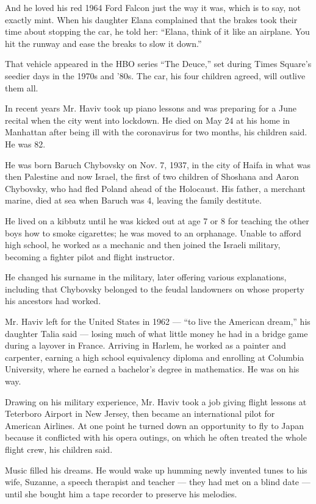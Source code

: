 And he loved his red 1964 Ford Falcon just the way it was, which is to
say, not exactly mint. When his daughter Elana complained that the
brakes took their time about stopping the car, he told her: ``Elana,
think of it like an airplane. You hit the runway and ease the breaks to
slow it down.''

That vehicle appeared in the HBO series ``The Deuce,'' set during Times
Square's seedier days in the 1970s and '80s. The car, his four children
agreed, will outlive them all.

In recent years Mr. Haviv took up piano lessons and was preparing for a
June recital when the city went into lockdown. He died on May 24 at his
home in Manhattan after being ill with the coronavirus for two months,
his children said. He was 82.

He was born Baruch Chybovsky on Nov. 7, 1937, in the city of Haifa in
what was then Palestine and now Israel, the first of two children of
Shoshana and Aaron Chybovsky, who had fled Poland ahead of the
Holocaust. His father, a merchant marine, died at sea when Baruch was 4,
leaving the family destitute.

He lived on a kibbutz until he was kicked out at age 7 or 8 for teaching
the other boys how to smoke cigarettes; he was moved to an orphanage.
Unable to afford high school, he worked as a mechanic and then joined
the Israeli military, becoming a fighter pilot and flight instructor.

He changed his surname in the military, later offering various
explanations, including that Chybovsky belonged to the feudal landowners
on whose property his ancestors had worked.

Mr. Haviv left for the United States in 1962 --- ``to live the American
dream,'' his daughter Talia said --- losing much of what little money he
had in a bridge game during a layover in France. Arriving in Harlem, he
worked as a painter and carpenter, earning a high school equivalency
diploma and enrolling at Columbia University, where he earned a
bachelor's degree in mathematics. He was on his way.

Drawing on his military experience, Mr. Haviv took a job giving flight
lessons at Teterboro Airport in New Jersey, then became an international
pilot for American Airlines. At one point he turned down an opportunity
to fly to Japan because it conflicted with his opera outings, on which
he often treated the whole flight crew, his children said.

Music filled his dreams. He would wake up humming newly invented tunes
to his wife, Suzanne, a speech therapist and teacher --- they had met on
a blind date --- until she bought him a tape recorder to preserve his
melodies.

